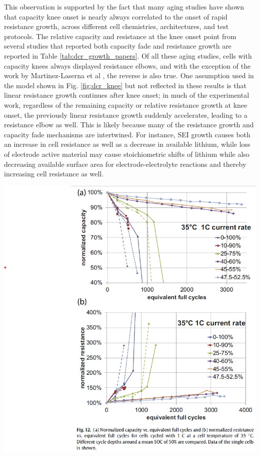 \documentclass[journal=jpcl, manuscript=article, layout=onecolumn]{achemso}
\begin{document}
This observation is supported by the fact that many aging studies have shown that capacity knee onset is nearly always correlated to the onset of rapid resistance growth, across different cell chemistries, architectures, and test protocols. The relative capacity and resistance at the knee onset point from several studies that reported both capacity fade and resistance growth are reported in Table \ref{tab:dcr_growth_papers}. Of all these aging studies, cells with capacity knees always displayed resistance elbows, and with the exception of the work by Martinez-Laserna et al \cite{martinez-laserna_technical_2018}, the reverse is also true. One assumption used in the model shown in Fig. \ref{fig:dcr_knee} but not reflected in these results is that linear resistance growth continues after knee onset; in much of the experimental work, regardless of the remaining capacity or relative resistance growth at knee onset, the previously linear resistance growth suddenly accelerates, leading to a resistance elbow as well. This is likely because many of the resistance growth and capacity fade mechanisms are intertwined. For instance, SEI growth causes both an increase in cell resistance as well as a decrease in available lithium, while loss of electrode active material may cause stoichiometric shifts of lithium while also decreasing available surface area for electrode-electrolyte reactions and thereby increasing cell resistance as well.

\hfil\includegraphics[scale=1]{images/Ecker_2014_fig12.jpg}
\end{document}
